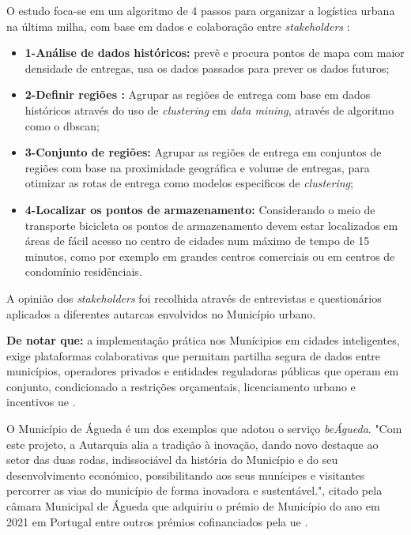 \newpage
O estudo  foca-se em um algoritmo de 4 passos para organizar a logística urbana na última milha, com base em dados e colaboração entre \textit{stakeholders} \cite{Correia02062024}:
\begin{itemize}
    \item \textbf{1-Análise de dados históricos:} prevê e procura pontos de mapa com maior densidade de entregas, usa os dados passados para prever os dados futuros;
    \item  \textbf{2-Definir regiões :} Agrupar as regiões de entrega com base em dados históricos através do uso de \textit{clustering} em \textit{data mining}, através de algoritmo como o \gls{dbscan};
    \item  \textbf{3-Conjunto de regiões:} Agrupar as regiões de entrega em conjuntos de regiões com base na proximidade geográfica e volume de entregas, para otimizar as rotas de entrega como modelos especificos de \textit{clustering};
    \item \textbf{4-Localizar os pontos de armazenamento:} Considerando o meio de transporte bicicleta os pontos de armazenamento devem estar localizados em áreas de fácil acesso no centro de cidades num máximo de tempo de 15 minutos, como por exemplo em grandes centros comerciais ou em centros de condomínio residênciais.
\end{itemize}

A opinião dos \textit{stakeholders} foi recolhida através de entrevistas e questionários aplicados a diferentes autarcas envolvidos no Município urbano.

\textbf{De notar que:} a implementação prática nos Munícipios em cidades inteligentes, exige plataformas colaborativas que permitam partilha segura de dados entre municípios, operadores privados e entidades reguladoras públicas que operam em conjunto, condicionado a  restrições orçamentais, licenciamento urbano e incentivos \gls{ue} \cite{Portugal2030_2023}.

O Município de Águeda é um dos exemplos que adotou o serviço \textit{beÁgueda}. "Com este projeto, a Autarquia alia a tradição à inovação, dando novo destaque ao setor das duas rodas, indissociável da história do Município e do seu desenvolvimento económico, possibilitando aos seus munícipes e visitantes percorrer as vias do município de forma inovadora e sustentável.", citado pela câmara Municipal de Águeda que adquiriu o prémio de Município do ano em 2021 em Portugal entre outros prémios cofinanciados pela \gls{ue} \cite{BeÁgueda}.

